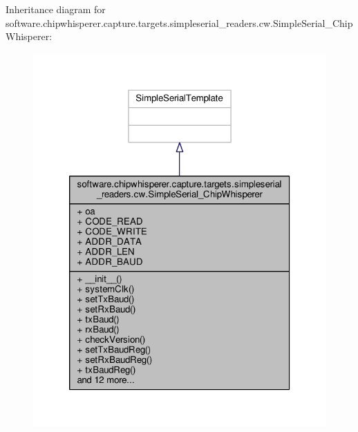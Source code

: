 Inheritance diagram for software.\+chipwhisperer.\+capture.\+targets.\+simpleserial\+\_\+readers.\+cw.\+Simple\+Serial\+\_\+\+Chip\+Whisperer\+:\nopagebreak
\begin{figure}[H]
\begin{center}
\leavevmode
\includegraphics[width=320pt]{d2/d91/classsoftware_1_1chipwhisperer_1_1capture_1_1targets_1_1simpleserial__readers_1_1cw_1_1SimpleSer6115372e489939d05766cb2df0959177}
\end{center}
\end{figure}


